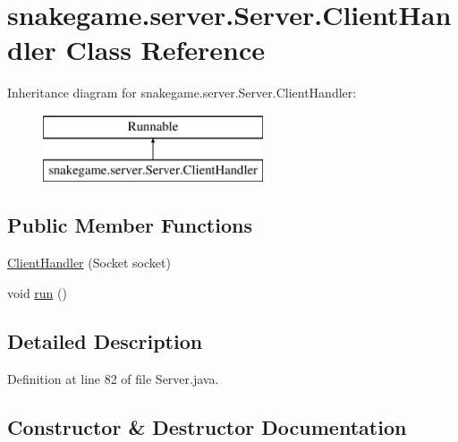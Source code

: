 \hypertarget{classsnakegame_1_1server_1_1_server_1_1_client_handler}{}\section{snakegame.\+server.\+Server.\+Client\+Handler Class Reference}
\label{classsnakegame_1_1server_1_1_server_1_1_client_handler}
Inheritance diagram for snakegame.\+server.\+Server.\+Client\+Handler\+:\begin{figure}[H]
\begin{center}
\leavevmode
\includegraphics[height=2.000000cm]{classsnakegame_1_1server_1_1_server_1_1_client_handler}
\end{center}
\end{figure}
\subsection*{Public Member Functions}
\begin{DoxyCompactItemize}
\item 
\mbox{\hyperlink{classsnakegame_1_1server_1_1_server_1_1_client_handler_ad00a7d1d8e8ee23d5495fbe27d734828}{Client\+Handler}} (Socket socket)
\item 
void \mbox{\hyperlink{classsnakegame_1_1server_1_1_server_1_1_client_handler_a5cb1108121c65a4e73e8c55e0f6d97e8}{run}} ()
\end{DoxyCompactItemize}


\subsection{Detailed Description}


Definition at line 82 of file Server.\+java.



\subsection{Constructor \& Destructor Documentation}
\mbox{\label{classsnakegame_1_1server_1_1_server_1_1_client_handler_ad00a7d1d8e8ee23d5495fbe27d734828}} 
